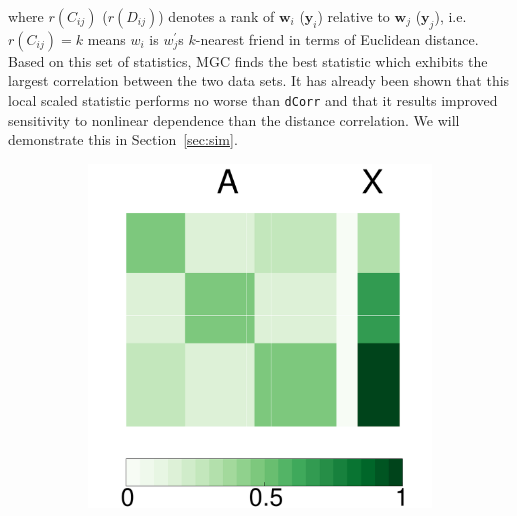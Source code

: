 \documentclass[12pt]{article}
\theoremstyle{definition}
\begin{document}
where $r(C_{ij})$ ($r(D_{ij})$) denotes a rank of $\mathbf{w}_{i}$ ($\mathbf{y}_{i}$) relative to $\mathbf{w}_{j}$ ($\mathbf{y}_{j}$), i.e. $r(C_{ij}) = k$ means $w_{i}$ is $w^{'}_{j}$s $k$-nearest friend in terms of Euclidean distance. Based on this set of statistics, MGC finds the best statistic which exhibits the largest correlation between the two data sets. It has already been shown that this local scaled statistic performs no worse than \texttt{dCorr} and that it results improved sensitivity to nonlinear dependence than the distance correlation. We will demonstrate this in Section~\ref{sec:sim}.

\begin{figure}[H]
	\centering
	\begin{subfigure}[b]{0.23\textwidth}
		\includegraphics[width=\textwidth]{../../Figure/Pmat.pdf}
		\caption{}
		\label{fig:a}
	\end{subfigure}
	~ %
	\begin{subfigure}[b]{0.23\textwidth}

\end{subfigure}
\end{figure}
\end{document}
